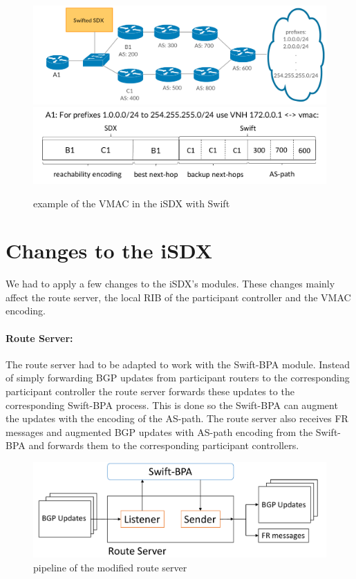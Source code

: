 \begin{figure}[h]
\center
\includegraphics[scale = 0.24]{Figures/design_vmac_topology.pdf}
\includegraphics[scale = 0.35]{Figures/design_vmac_cropped.pdf}
\caption{example of the VMAC in the iSDX with Swift}
\end{figure}

\section{\label{chapter4:Changes_to_the_iSDX}Changes to the iSDX}

We had to apply a few changes to the iSDX's modules. These changes mainly affect the route server, the local RIB of the participant controller and the VMAC encoding. 

\paragraph{\label{chapter4:Changes to the iSDX:route server}Route Server:}

The route server had to be adapted to work with the Swift-BPA module. 
Instead of simply forwarding BGP updates from participant routers to the corresponding participant controller the route server forwards these updates to the corresponding Swift-BPA process. This is done so the Swift-BPA can augment the updates with the encoding of the AS-path. The route server also receives FR messages and augmented BGP updates with AS-path encoding from the Swift-BPA and forwards them to the corresponding participant controllers. 
\begin{figure}[h]
\center
\includegraphics[scale = 0.45]{Figures/design_route_server_cropped2.pdf}
\caption{pipeline of the modified route server}
\end{figure}


